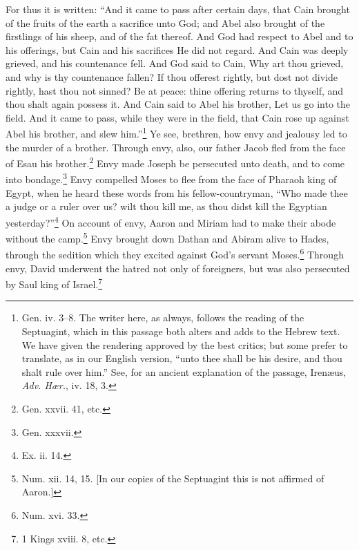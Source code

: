 
For thus it is written: “And it came to pass after certain days, that Cain brought of the fruits of the earth a sacrifice unto God; and Abel also brought of the firstlings of his sheep, and of the fat thereof. And God had respect to Abel and to his offerings, but Cain and his sacrifices He did not regard. And Cain was deeply grieved, and his countenance fell. And God said to Cain, Why art thou grieved, and why is thy countenance fallen? If thou offerest rightly, but dost not divide rightly, hast thou not sinned? Be at peace: thine offering returns to thyself, and thou shalt again possess it. And Cain said to Abel his brother, Let us go into the field. And it came to pass, while they were in the field, that Cain rose up against Abel his brother, and slew him.”\footnote{Gen. iv. 3–8. The writer here, as always, follows the reading of the Septuagint, which in this passage both alters and adds to the Hebrew text. We have given the rendering approved by the best critics; but some prefer to translate, as in our English version, “unto thee shall be his desire, and thou shalt rule over him.” See, for an ancient explanation of the passage, Irenæus, \emph{Adv. Hær.}, iv. 18, 3.} Ye see, brethren, how envy and jealousy led to the murder of a brother. Through envy, also, our father Jacob fled from the face of Esau his brother.\footnote{Gen. xxvii. 41, etc.} Envy made Joseph be persecuted unto death, and to come into bondage.\footnote{Gen. xxxvii.} Envy compelled Moses to flee from the face of Pharaoh king of Egypt, when he heard these words from his fellow-countryman, “Who made thee a judge or a ruler over us? wilt thou kill me, as thou didst kill the Egyptian yesterday?”\footnote{Ex. ii. 14.} On account of envy, Aaron and Miriam had to make their abode without the camp.\footnote{Num. xii. 14, 15. [In our copies of the Septuagint this is not affirmed of Aaron.]} Envy brought down Dathan and Abiram alive to Hades, through the sedition which they excited against God’s servant Moses.\footnote{Num. xvi. 33.} Through envy, David underwent the hatred not only of foreigners, but was also persecuted by Saul king of Israel.\footnote{1 Kings xviii. 8, etc.}


